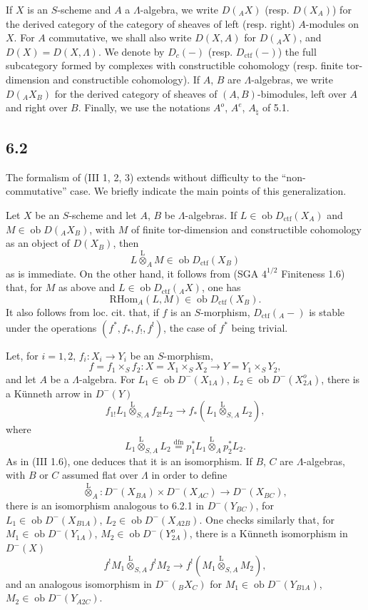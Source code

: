 \documentclass[11pt]{article}
\providecommand{\RHom}{\mathrm{RHom}}
\providecommand{\lten}{\overset{\mathrm L}{\otimes}}
\providecommand{\Ob}{\operatorname{ob}}
\providecommand{\RHom}{\mathrm{RHom}}
\providecommand{\lten}{\overset{\mathrm L}{\otimes}}
\providecommand{\RHom}{\mathrm R\mathcal{H}om}
\providecommand{\lten}{\overset{\mathrm L}{\otimes}}
\providecommand{\Ob}{\operatorname{ob}}
\providecommand{\lten}{\overset{\mathrm L}{\otimes}}
\providecommand{\lten}{\overset{\mathrm L}{\otimes}}
\providecommand{\Ob}{\operatorname{Ob}}
\providecommand{\lten}{\overset{\mathrm L}{\otimes}}
\providecommand{\RHom}{\mathrm{RHom}}
\begin{document}
If $X$ is an $S$-scheme and $A$ a $\Lambda$-algebra, we write $D({}_AX)$ (resp. $D(X_A)$) for the derived category of the category of sheaves of left (resp. right) $A$-modules on $X$. For $A$ commutative, we shall also write $D(X,A)$ for $D({}_AX)$, and $D(X)=D(X,\Lambda)$. We denote by $D_c(-)$ (resp. $D_{\mathrm{ctf}}(-)$) the full subcategory formed by complexes with constructible cohomology (resp. finite tor-dimension and constructible cohomology). If $A$, $B$ are $\Lambda$-algebras, we write $D({}_AX_B)$ for the derived category of sheaves of $(A,B)$-bimodules, left over $A$ and right over $B$. Finally, we use the notations $A^o$, $A^e$, $A_{\natural}$ of 5.1.

\subsection*{6.2}
The formalism of (III 1, 2, 3) extends without difficulty to the “non-commutative” case. We briefly indicate the main points of this generalization.

Let $X$ be an $S$-scheme and let $A$, $B$ be $\Lambda$-algebras. If $L\in\Ob D_{\mathrm{ctf}}(X_A)$ and $M\in\Ob D({}_AX_B)$, with $M$ of finite tor-dimension and constructible cohomology as an object of $D(X_B)$, then
\[
L\lten_A M\in\Ob D_{\mathrm{ctf}}(X_B)
\]
as is immediate. On the other hand, it follows from (SGA $4^{1/2}$ Finiteness 1.6) that, for $M$ as above and $L\in\Ob D_{\mathrm{ctf}}({}_AX)$, one has
\[
\RHom_A(L,M)\in\Ob D_{\mathrm{ctf}}(X_B).
\]
It also follows from loc. cit. that, if $f$ is an $S$-morphism, $D_{\mathrm{ctf}}({}_A-)$ is stable under the operations $(f^*,f_*,f_!,f^!)$, the case of $f^*$ being trivial.

Let, for $i=1,2$, $f_i:X_i\to Y_i$ be an $S$-morphism,
\[
f=f_1\times_S f_2:X=X_1\times_SX_2\longrightarrow Y=Y_1\times_SY_2,
\]
and let $A$ be a $\Lambda$-algebra. For $L_1\in\Ob D^-(X_{1A})$, $L_2\in\Ob D^-(X_{2A}^o)$, there is a Künneth arrow in $D^-(Y)$
\begin{equation}
f_{1!}L_1\lten_{S,A}f_{2!}L_2
\longrightarrow
f_*(L_1\lten_{S,A}L_2),
\tag{6.2.1}
\end{equation}
where
\[
L_1\lten_{S,A}L_2
\stackrel{\mathrm{dfn}}{=}p_1^*L_1\lten_Ap_2^*L_2.
\]
As in (III 1.6), one deduces that it is an isomorphism. If $B$, $C$ are $\Lambda$-algebras, with $B$ or $C$ assumed flat over $\Lambda$ in order to define
\[
\lten_A:D^-(X_{BA})\times D^-(X_{AC})\longrightarrow D^-(X_{BC}),
\]
there is an isomorphism analogous to 6.2.1 in $D^-(Y_{BC})$, for $L_1\in\Ob D^-(X_{B1A})$, $L_2\in\Ob D^-(X_{A2B})$. One checks similarly that, for $M_1\in\Ob D^-(Y_{1A})$, $M_2\in\Ob D^-(Y_{2A}^o)$, there is a Künneth isomorphism in $D^-(X)$
\begin{equation}
f^!M_1\lten_{S,A}f^!M_2
\longrightarrow
f^!(M_1\lten_{S,A}M_2),
\tag{6.2.2}
\end{equation}
and an analogous isomorphism in $D^-({}_B X_C)$ for $M_1\in\Ob D^-(Y_{B1A})$, $M_2\in\Ob D^-(Y_{A2C})$.
\end{document}
